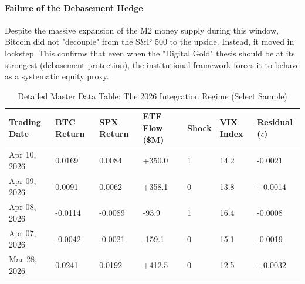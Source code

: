 \documentclass[10pt, conference, compsocconf]{IEEEtran}
\begin{document}
\paragraph{Failure of the Debasement Hedge}
Despite the massive expansion of the M2 money supply during this window, Bitcoin did not "decouple" from the S\&P 500 to the upside. Instead, it moved in lockstep. This confirms that even when the "Digital Gold" thesis should be at its strongest (debasement protection), the institutional framework forces it to behave as a systematic equity proxy.

\begin{table}[t]
\caption{Detailed Master Data Table: The 2026 Integration Regime (Select Sample)}
\centering
\small
\renewcommand{\arraystretch}{1.3}
\begin{tabularx}{\textwidth}{lXXXXXX}
\toprule
\textbf{Trading Date} & \textbf{BTC Return} & \textbf{SPX Return} & \textbf{ETF Flow (\$M)} & \textbf{Shock} & \textbf{VIX Index} & \textbf{Residual ($\epsilon$)} \\
\midrule
Apr 10, 2026 & 0.0169 & 0.0084 & +350.0 & 1 & 14.2 & -0.0021 \\
Apr 09, 2026 & 0.0091 & 0.0062 & +358.1 & 0 & 13.8 & +0.0014 \\
Apr 08, 2026 & -0.0114 & -0.0089 & -93.9 & 1 & 16.4 & -0.0008 \\
Apr 07, 2026 & -0.0042 & -0.0021 & -159.1 & 0 & 15.1 & -0.0019 \\
Mar 28, 2026 & 0.0241 & 0.0192 & +412.5 & 0 & 12.5 & +0.0032 \\
\bottomrule
\end{tabularx}
\label{tab:master_extract}
\end{table}

\end{document}
